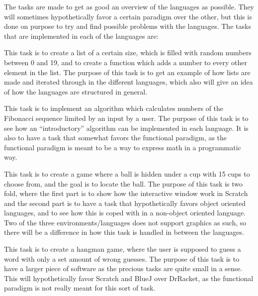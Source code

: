 The tasks are made to get as good an overview of the languages as possible. They will sometimes hypothetically favor a certain paradigm over the other, but this is done on purpose to try and find possible problems with the languages. The tasks that are implemented in each of the languages are:
\begin{description}[style=nextline]
\item[Task 1: Iterator] This task is to create a list of a certain size, which is filled with random numbers between 0 and 19, and to create a function which adds a number to every other element in the list. The purpose of this task is to get an example of how lists are made and iterated through in the different languages, which also will give an idea of how the languages are structured in general.
\item[Task 2: Fibonacci Sequence] This task is to implement an algorithm which calculates numbers of the Fibonacci sequence limited by an input by a user. The purpose of this task is to see how an ``introductory'' algorithm can be implemented in each language. It is also to have a task that somewhat favors the functional paradigm, as the functional paradigm is meant to be a way to express math in a programmatic way.
\item[Task 3: Cups and Ball] This task is to create a game where a ball is hidden under a cup with 15 cups to choose from, and the goal is to locate the ball. The purpose of this task is two fold, where the first part is to show how the interactive window work in Scratch and the second part is to have a task that hypothetically favors object oriented languages, and to see how this is coped with in a non-object oriented language. Two of the three environments/languages does not support graphics as such, so there will be a difference in how this task is handled in between the languages.
\item[Task 4: Hangman] This task is to create a hangman game, where the user is supposed to guess a word with only a set amount of wrong guesses. The purpose of this task is to have a larger piece of software as the precious tasks are quite small in a sense. This will hypothetically favor Scratch and BlueJ over DrRacket, as the functional paradigm is not really meant for this sort of task.
\end{description}


